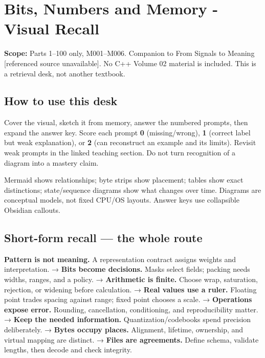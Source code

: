 \hypertarget{appendix-ef4d27797a92}{}
\section{Bits, Numbers and Memory - Visual Recall}\label{appendix-ef4d27797a92-bits-numbers-and-memory---visual-recall}

\textbf{Scope:} Parts 1--100 only, M001--M006. Companion to {From Signals to Meaning {[}referenced source unavailable{]}}. No C++ Volume 02 material is included. This is a retrieval desk, not another textbook.

\subsection{How to use this desk}\label{appendix-ef4d27797a92-how-to-use-this-desk}

Cover the visual, sketch it from memory, answer the numbered prompts, then expand the answer key. Score each prompt \textbf{0} (missing/wrong), \textbf{1} (correct label but weak explanation), or \textbf{2} (can reconstruct an example and its limits). Revisit weak prompts in the linked teaching section. Do not turn recognition of a diagram into a mastery claim.

Mermaid shows relationships; byte strips show placement; tables show exact distinctions; state/sequence diagrams show what changes over time. Diagrams are conceptual models, not fixed CPU/OS layouts. Answer keys use collapsible Obsidian callouts.

\subsection{Short-form recall --- the whole route}\label{appendix-ef4d27797a92-short-form-recall-the-whole-route}

\textbf{Pattern is not meaning.} A representation contract assigns weights and interpretation. → \textbf{Bits become decisions.} Masks select fields; packing needs widths, ranges, and a policy. → \textbf{Arithmetic is finite.} Choose wrap, saturation, rejection, or widening before calculation. → \textbf{Real values use a ruler.} Floating point trades spacing against range; fixed point chooses a scale. → \textbf{Operations expose error.} Rounding, cancellation, conditioning, and reproducibility matter. → \textbf{Keep the needed information.} Quantization/codebooks spend precision deliberately. → \textbf{Bytes occupy places.} Alignment, lifetime, ownership, and virtual mapping are distinct. → \textbf{Files are agreements.} Define schema, validate lengths, then decode and check integrity.

